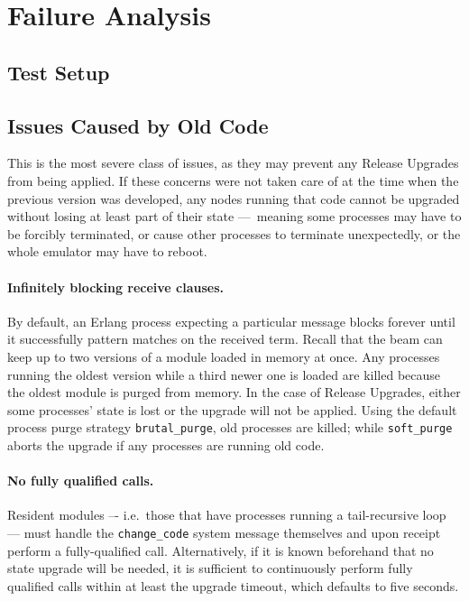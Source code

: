 \cleardoublepage
\section{Failure Analysis}


\subsection{Test Setup}


\subsection{Issues Caused by Old Code}

This is the most severe class of issues, as they may prevent any Release Upgrades from being applied. If these concerns were not taken care of at the time when the previous version was developed, any nodes running that code cannot be upgraded without losing at least part of their state –– meaning some processes may have to be forcibly terminated, or cause other processes to terminate unexpectedly, or the whole emulator may have to reboot.

\paragraph{Infinitely blocking receive clauses.}
By default, an Erlang process expecting a particular message blocks forever until it successfully pattern matches on the received term. Recall that the \acrshort{beam} can keep up to two versions of a module loaded in memory at once. Any processes running the oldest version while a third newer one is loaded are killed because the oldest module is purged from memory. In the case of Release Upgrades, either some processes' state is lost or the upgrade will not be applied. Using the default process purge strategy \lstinline|brutal_purge|, old processes are killed; while \lstinline|soft_purge| aborts the upgrade if any processes are running old code.

\paragraph{No fully qualified calls.}
Resident modules –- i.e.~those that have processes running a tail-recursive loop –– must handle the \lstinline|change_code| system message themselves and upon receipt perform a fully-qualified call. Alternatively, if it is known beforehand that no state upgrade will be needed, it is sufficient to continuously perform fully qualified calls within at least the upgrade timeout, which defaults to five seconds.

